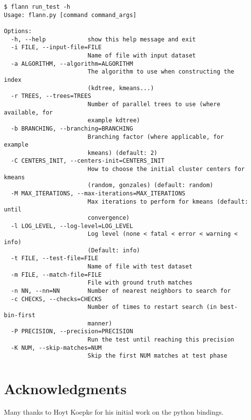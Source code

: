 \documentclass[letter,10pt]{article}
\begin{document}
\begin{Verbatim}[fontsize=\footnotesize,frame=single]
$ flann run_test -h
Usage: flann.py [command command_args]

Options:
  -h, --help            show this help message and exit
  -i FILE, --input-file=FILE
                        Name of file with input dataset
  -a ALGORITHM, --algorithm=ALGORITHM
                        The algorithm to use when constructing the index
                        (kdtree, kmeans...)
  -r TREES, --trees=TREES
                        Number of parallel trees to use (where available, for
                        example kdtree)
  -b BRANCHING, --branching=BRANCHING
                        Branching factor (where applicable, for example
                        kmeans) (default: 2)
  -C CENTERS_INIT, --centers-init=CENTERS_INIT
                        How to choose the initial cluster centers for kmeans
                        (random, gonzales) (default: random)
  -M MAX_ITERATIONS, --max-iterations=MAX_ITERATIONS
                        Max iterations to perform for kmeans (default: until
                        convergence)
  -l LOG_LEVEL, --log-level=LOG_LEVEL
                        Log level (none < fatal < error < warning < info)
                        (Default: info)
  -t FILE, --test-file=FILE
                        Name of file with test dataset
  -m FILE, --match-file=FILE
                        File with ground truth matches
  -n NN, --nn=NN        Number of nearest neighbors to search for
  -c CHECKS, --checks=CHECKS
                        Number of times to restart search (in best-bin-first
                        manner)
  -P PRECISION, --precision=PRECISION
                        Run the test until reaching this precision
  -K NUM, --skip-matches=NUM
                        Skip the first NUM matches at test phase

\end{Verbatim}


\section{Acknowledgments}

Many thanks to Hoyt Koepke for his initial work on the python bindings.






\end{document}
